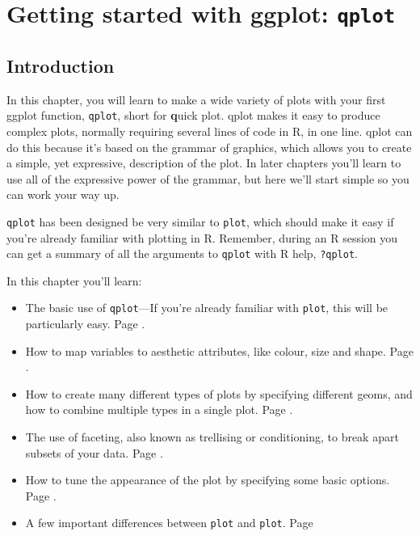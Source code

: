 


% 



\chapter{Getting started with ggplot: {\tt qplot}}

\section{Introduction} 

In this chapter, you will learn to make a wide variety of plots with your first ggplot function, {\tt qplot}, short for {\bf q}uick plot. qplot makes it easy to produce complex plots, normally requiring several lines of code in R, in one line. qplot can do this because it's based on the grammar of graphics, which allows you to create a simple, yet expressive, description of the plot.  In later chapters you'll learn to use all of the expressive power of the grammar, but here we'll start simple so you can work your way up.

{\tt qplot} has been designed be very similar to {\tt plot}, which should make it easy if you're already familiar with plotting in R.  Remember, during an R session you can get a summary of all the arguments to {\tt qplot} with R help, {\tt ?qplot}.

In this chapter you'll learn:

\begin{itemize}
	\item The basic use of {\tt qplot}---If you're already familiar with {\tt plot}, this will be particularly easy. Page \pageref{sec:basic_use}.
	\item How to map variables to aesthetic attributes, like colour, size and shape. Page \pageref{sec:aesthetic_attributes}.
	\item How to create many different types of plots by specifying different geoms, and how to combine multiple types in a single plot. Page \pageref{sec:plot_geoms}.
	\item The use of faceting, also known as trellising or conditioning, to break apart subsets of your data. Page \pageref{sec:faceting}.
	\item How to tune the appearance of the plot by specifying some basic options. Page \pageref{sec:other_options}.
	\item A few important differences between {\tt plot} and {\tt plot}.  Page \pageref{sec:plot_diffs}
\end{itemize}


